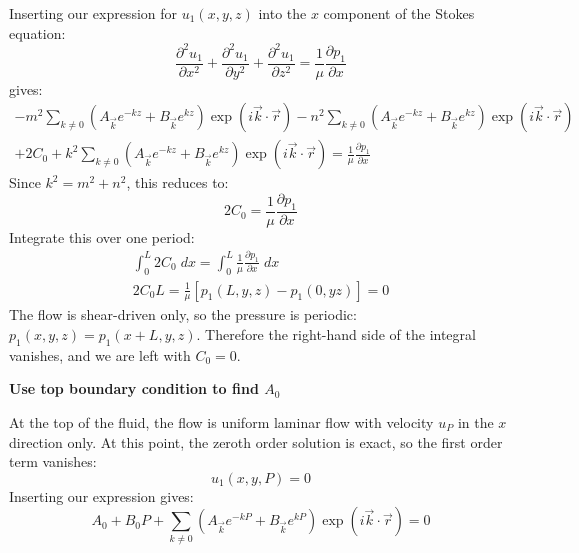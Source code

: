 \documentclass[12pt, a4paper, twoside, openright]{book}
\begin{document}
Inserting our expression for $u_1(x,y,z)$ into the $x$ component of the Stokes equation:
\begin{equation}
\frac{\partial^2 u_1}{\partial x^2} + \frac{\partial^2 u_1}{\partial y^2} +
\frac{\partial^2 u_1}{\partial z^2} =
\frac{1}{\mu} \frac{\partial p_1}{\partial x}
\end{equation}
gives:
\begin{multline}
- m^2
\sum_{k \neq 0} 
\left(  A_{\vec{k}} e^{-kz} + B_{\vec{k}} e^{kz} \right)
\exp(i \vec{k}\cdot \vec{r})
- n^2
\sum_{k \neq 0} 
\left(  A_{\vec{k}} e^{-kz} + B_{\vec{k}} e^{kz} \right)
\exp(i \vec{k}\cdot \vec{r}) \\
+ 2 C_0
+ k^2
\sum_{k \neq 0} 
\left(  A_{\vec{k}} e^{-kz} + B_{\vec{k}} e^{kz} \right)
\exp(i \vec{k}\cdot \vec{r})
= \frac{1}{\mu} \frac{\partial p_1}{\partial x}
\end{multline}
Since $k^2 = m^2 + n^2$, this reduces to:
\begin{equation}
2 C_0 = \frac{1}{\mu} \frac{\partial p_1}{\partial x}
\end{equation}
Integrate this over one period:
\begin{gather}
\int_0^L 2 C_0 \;dx = \int_0^L \frac{1}{\mu} \frac{\partial p_1}{\partial x} \;dx \\
2 C_0 L = \frac{1}{\mu} [ p_1(L,y,z) - p_1(0,yz) ] = 0
\end{gather}
The flow is shear-driven only, so the pressure is periodic: $p_1(x,y,z) = p_1(x+L,y,z)$.  Therefore the right-hand side of the integral vanishes, and we are left with $C_0 = 0$.

\vspace{1em}
\textbf{Use top boundary condition to find $A_0$}

At the top of the fluid, the flow is uniform laminar flow with velocity $u_P$ in the $x$ direction only.  At this point, the zeroth order solution is exact, so the first order term vanishes:
\begin{equation}
u_1(x,y,P) = 0
\end{equation} 
Inserting our expression gives:
\begin{equation}
A_0 + B_0 P + \sum_{k \neq 0} 
\left(  A_{\vec{k}} e^{-kP} + B_{\vec{k}} e^{kP} \right)
\exp(i \vec{k}\cdot \vec{r})
= 0
\end{equation}

\end{document}
